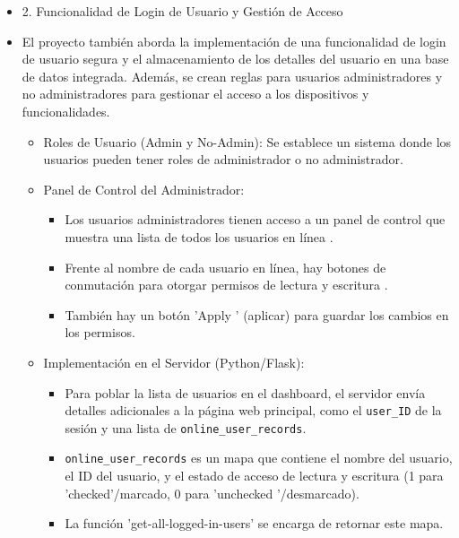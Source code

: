 \documentclass{report}
\begin{document}
\begin{itemize}
    \item 2. Funcionalidad de Login de Usuario y Gestión de Acceso
    \item El proyecto también aborda la implementación de una  funcionalidad de login de usuario segura  y el almacenamiento de los detalles del 
    usuario en una base de datos integrada. Además, se crean reglas para usuarios administradores y no administradores para gestionar el 
    acceso a los dispositivos y funcionalidades.
    \begin{itemize}
        \item Roles de Usuario (Admin y No-Admin): Se establece un sistema donde los usuarios pueden tener roles de administrador o no administrador. 
        
        \item Panel de Control del Administrador:
        \begin{itemize}
            \item Los usuarios administradores tienen acceso a un panel de control que muestra una  lista de todos los usuarios en línea .
            \item Frente al nombre de cada usuario en línea, hay  botones de conmutación para otorgar permisos de lectura y escritura .
            \item También hay un botón  'Apply ' (aplicar) para guardar los cambios en los permisos.        
        \end{itemize}

        \item Implementación en el Servidor (Python/Flask):
        \begin{itemize}
            \item Para poblar la lista de usuarios en el dashboard, el servidor envía detalles adicionales a la página web principal, como 
            el \verb|user_ID| de la sesión y una lista de \verb|online_user_records|.
            \item \verb|online_user_records| es un mapa que contiene el nombre del usuario, el ID del usuario, y el estado de acceso de lectura 
            y escritura (1 para 'checked'/marcado, 0 para  'unchecked '/desmarcado).
            \item La función 'get-all-logged-in-users' se encarga de retornar este mapa.
        \end{itemize}


\end{itemize}
\end{itemize}
\end{document}
